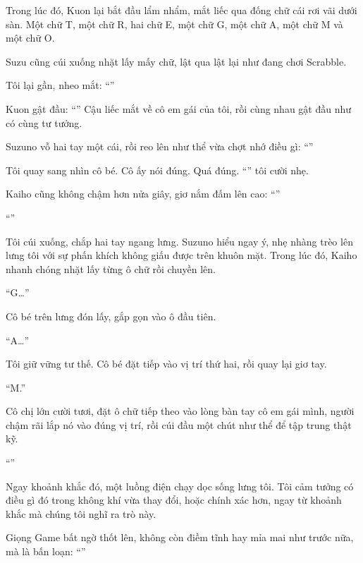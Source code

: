 \documentclass[../main.tex]{subfiles}
\begin{document}
Trong lúc đó, Kuon lại bắt đầu lẩm nhẩm, mắt liếc qua đống chữ cái rơi vãi dưới sàn. Một chữ T, một chữ R, hai chữ E, một chữ G, một chữ A, một chữ M và một chữ O.

Suzu cũng cúi xuống nhặt lấy mấy chữ, lật qua lật lại như đang chơi Scrabble.

Tôi lại gần, nheo mắt: ``''

Kuon gật đầu: ``'' Cậu liếc mắt về cô em gái của tôi, rồi cùng nhau gật đầu như có cùng tư tưởng.


Suzuno vỗ hai tay một cái, rồi reo lên như thể vừa chợt nhớ điều gì: ``''

Tôi quay sang nhìn cô bé. Cô ấy nói đúng. Quá đúng. ``'' tôi cười nhẹ.

Kaiho cũng không chậm hơn nửa giây, giơ nắm đấm lên cao: ``''

``''

Tôi cúi xuống, chắp hai tay ngang lưng. Suzuno hiểu ngay ý, nhẹ nhàng trèo lên lưng tôi với sự phấn khích không giấu được trên khuôn mặt. Trong lúc đó, Kaiho nhanh chóng nhặt lấy từng ô chữ rồi chuyền lên.

``G\dots''

Cô bé trên lưng đón lấy, gắp gọn vào ô đầu tiên.

``A\dots''

Tôi giữ vững tư thế. Cô bé đặt tiếp vào vị trí thứ hai, rồi quay lại giơ tay.

``M.''

Cô chị lớn cười tươi, đặt ô chữ tiếp theo vào lòng bàn tay cô em gái mình, người chậm rãi lắp nó vào đúng vị trí, rồi cúi đầu một chút như thể để tập trung thật kỹ.

``''

Ngay khoảnh khắc đó, một luồng điện chạy dọc sống lưng tôi. Tôi cảm tưởng có điều gì đó trong không khí vừa thay đổi, hoặc chính xác hơn, ngay từ khoảnh khắc mà chúng tôi nghĩ ra trò này.

Giọng Game bất ngờ thốt lên, không còn điềm tĩnh hay mỉa mai như trước nữa, mà là bấn loạn: ``''
\end{document}

